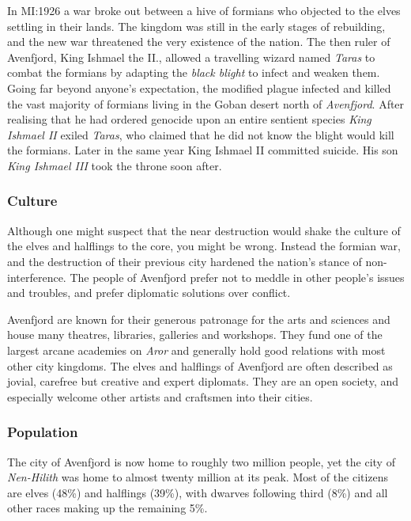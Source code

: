 In MI:1926 a war broke out between a hive of formians who objected to the
elves settling in their lands. The kingdom was still in the early stages of
rebuilding, and the new war threatened the very existence of the nation. The
then ruler of Avenfjord, King Ishmael the II., allowed a travelling wizard
named \emph{Taras} to combat the formians by adapting the \emph{black blight}
to infect and weaken them. Going far beyond anyone's expectation, the modified
plague infected and killed the vast majority of formians living in the Goban
desert north of \emph{Avenfjord}. After realising that he had ordered genocide
upon an entire sentient species \emph{King Ishmael II} exiled \emph{Taras}, who
claimed that he did not know the blight would kill the formians. Later in the
same year King Ishmael II committed suicide. His son \emph{King Ishmael III}
took the throne soon after.


\subsubsection*{Culture}

Although one might suspect that the near destruction would shake the culture
of the elves and halflings to the core, you might be wrong. Instead the
formian war, and the destruction of their previous city hardened the nation's
stance of non-interference. The people of Avenfjord prefer not to meddle in
other people's issues and troubles, and prefer diplomatic solutions over
conflict.

Avenfjord are known for their generous patronage for the arts and sciences and
house many theatres, libraries, galleries and workshops. They fund one of the
largest arcane academies on \emph{Aror} and generally hold good relations with
most other city kingdoms. The elves and halflings of Avenfjord are often
described as jovial, carefree but creative and expert diplomats. They are an
open society, and especially welcome other artists and craftsmen into their
cities.

\subsubsection*{Population}

The city of Avenfjord is now home to roughly two million people, yet the city
of \emph{Nen-Hilith} was home to almost twenty million at its peak. Most of
the citizens are elves (48\%) and halflings (39\%), with dwarves following
third (8\%) and all other races making up the remaining 5\%.

